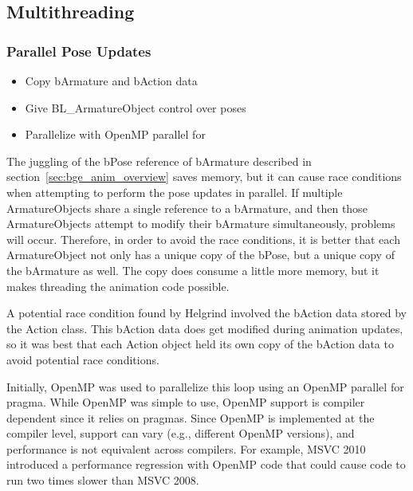 \subsection{Multithreading}
\subsubsection{Parallel Pose Updates}
\ifsummaries
\begin{itemize}
 \item Copy bArmature and bAction data
 \item Give BL\_ArmatureObject control over poses
 \item Parallelize with OpenMP parallel for
\end{itemize}
\fi

The juggling of the bPose reference of bArmature described in section~\ref{sec:bge_anim_overview} saves memory, but it can cause race conditions when attempting to perform the pose updates in parallel.
If multiple ArmatureObjects share a single reference to a bArmature, and then those ArmatureObjects attempt to modify their bArmature simultaneously, problems will occur.
Therefore, in order to avoid the race conditions, it is better that each ArmatureObject not only has a unique copy of the bPose, but a unique copy of the bArmature as well.
The copy does consume a little more memory, but it makes threading the animation code possible.


A potential race condition found by Helgrind involved the bAction data stored by the Action class.
This bAction data does get modified during animation updates, so it was best that each Action object held its own copy of the bAction data to avoid potential race conditions.

Initially, OpenMP\cite{openmp} was used to parallelize this loop using an OpenMP parallel for pragma.
While OpenMP was simple to use, OpenMP support is compiler dependent since it relies on pragmas.
Since OpenMP is implemented at the compiler level, support can vary (e.g., different OpenMP versions), and performance is not equivalent across compilers.
For example,  MSVC 2010 introduced a performance regression with OpenMP code that could cause code to run two times slower than MSVC 2008.

